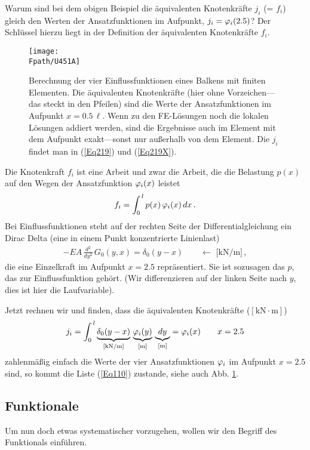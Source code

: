 Warum sind bei dem obigen Beispiel die \"{a}quivalenten Knotenkr\"{a}fte $j_i$ (= $f_i$) gleich den Werten der Ansatzfunktionen im Aufpunkt, $j_i = \varphi_i(2.5)$? Der Schl\"{u}ssel hierzu liegt in der Definition der \"{a}quivalenten Knotenkr\"{a}fte $f_i$.

\begin{figure}[tbp]
\centering
\if {} \sidecaption[t] \fi
\texttt{[image: \\Fpath/U451A]}
\caption{Berechnung der vier Einflussfunktionen eines Balkens mit finiten Elementen. Die \"{a}quivalenten Knotenkr\"{a}fte (hier ohne Vorzeichen---das steckt in den Pfeilen) sind die Werte der Ansatzfunktionen im Aufpunkt $x = 0.5\,\ell$. Wenn zu den FE-L\"{o}sungen noch die lokalen L\"{o}sungen addiert werden, sind die Ergebnisse auch im Element mit dem Aufpunkt exakt---sonst nur au{\ss}erhalb von dem Element. Die $j_i$ findet man in (\ref{Eq219}) und (\ref{Eq219X}). } \label{U451}
\end{figure}%
Die Knotenkraft $f_i$ ist eine Arbeit und zwar die Arbeit, die die Belastung $p(x)$  auf den Wegen der Ansatzfunktion $\varphi_i(x)$ leistet
\begin{align}
f_i = \int_0^{\,l} p(x)\,\varphi_i(x)\,dx\,.
\end{align}
Bei Einflussfunktionen steht auf der rechten Seite der Differentialgleichung ein Dirac Delta (eine in einem Punkt konzentrierte Linienlast)
\begin{align}
-EA\,\frac{d^2}{dy^2}\,G_0(y,x) = \delta_0(y-x) \qquad \leftarrow \,\,\text{[kN/m]}\,,
\end{align}
die eine Einzelkraft im Aufpunkt $x = 2.5$ repr\"{a}sentiert. Sie ist sozusagen das $p$, das zur Einflussfunktion geh\"{o}rt. (Wir differenzieren auf der linken Seite nach $y$, dies ist hier die Laufvariable).

Jetzt rechnen wir und finden, dass die \"{a}quivalenten Knotenkr\"{a}fte ($[\text{kN} \cdot \text{m}]$)
\begin{align}
j_i = \int_0^{\,l} \underbrace{\delta_0(y-x)}_{[\text{kN/m}]}\,\underbrace{\varphi_i(y)}_{[\text{m}]}\,\underbrace{dy}_{\text{[m]}} = \varphi_i(x)  \qquad x = 2.5
\end{align}
zahlenm\"{a}{\ss}ig einfach die Werte der vier Ansatzfunktionen $\varphi_i$ im Aufpunkt $x = 2.5$ sind, so kommt die Liste (\ref{Eq110}) zustande, siehe auch Abb. \ref{U451}.

{\textcolor{sectionTitleBlue}{\section{Funktionale}}}
Um nun doch etwas systematischer vorzugehen, wollen wir den Begriff des Funktionals einf\"{u}hren.

